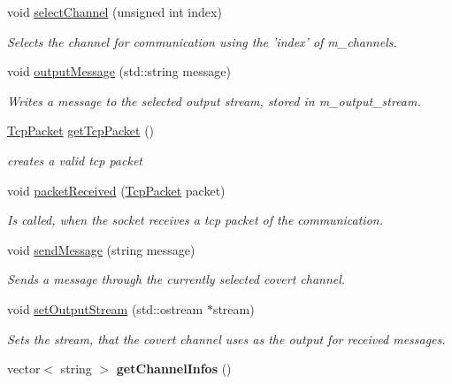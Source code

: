 \begin{DoxyCompactItemize}
\item 
void \hyperlink{classwhisper__library_1_1ChannelManager_a0b261a0299cf60341fd2ce2754eb5fa5}{select\-Channel} (unsigned int index)
\begin{DoxyCompactList}\small\item\em \-Selects the channel for communication using the 'index' of m\-\_\-channels. \end{DoxyCompactList}\item 
void \hyperlink{classwhisper__library_1_1ChannelManager_a530082678849bf48b11be67c8d137e22}{output\-Message} (std\-::string message)
\begin{DoxyCompactList}\small\item\em \-Writes a message to the selected output stream, stored in m\-\_\-output\-\_\-stream. \end{DoxyCompactList}\item 
\hyperlink{classwhisper__library_1_1TcpPacket}{\-Tcp\-Packet} \hyperlink{classwhisper__library_1_1ChannelManager_a7375561a1bbf24c418a86e76828110ff}{get\-Tcp\-Packet} ()
\begin{DoxyCompactList}\small\item\em creates a valid tcp packet \end{DoxyCompactList}\item 
void \hyperlink{classwhisper__library_1_1ChannelManager_ac0e320bbc7593d3f3972472f90a60820}{packet\-Received} (\hyperlink{classwhisper__library_1_1TcpPacket}{\-Tcp\-Packet} packet)
\begin{DoxyCompactList}\small\item\em \-Is called, when the socket receives a tcp packet of the communication. \end{DoxyCompactList}\item 
void \hyperlink{classwhisper__library_1_1ChannelManager_a33b7963e32e883de361584f9468ae67f}{send\-Message} (string message)
\begin{DoxyCompactList}\small\item\em \-Sends a message through the currently selected covert channel. \end{DoxyCompactList}\item 
void \hyperlink{classwhisper__library_1_1ChannelManager_a3e45c6a98f22336ab4481395f9007517}{set\-Output\-Stream} (std\-::ostream $\ast$stream)
\begin{DoxyCompactList}\small\item\em \-Sets the stream, that the covert channel uses as the output for received messages. \end{DoxyCompactList}\item 
\hypertarget{classwhisper__library_1_1ChannelManager_a01b025f7cb19645c514dd6da628b92ec}{vector$<$ string $>$ {\bfseries get\-Channel\-Infos} ()}\label{classwhisper__library_1_1ChannelManager_a01b025f7cb19645c514dd6da628b92ec}


\end{DoxyCompactItemize}

